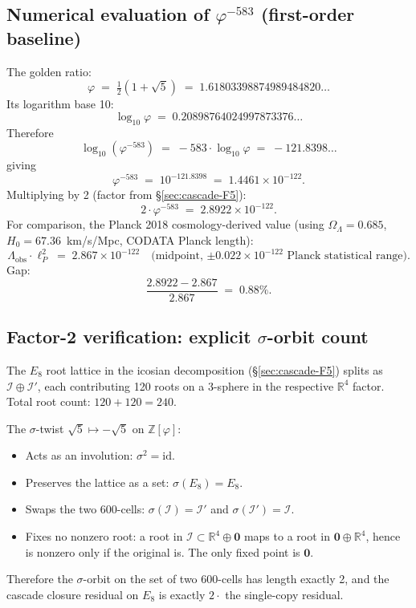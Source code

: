 \documentclass[11pt]{article}
\theoremstyle{plain}
\theoremstyle{definition}
\theoremstyle{remark}
\newcommand{\Zphi}{\mathbb{Z}[\varphi]}
\newcommand{\Ical}{\mathcal{I}}
\begin{document}
\subsection{Numerical evaluation of $\varphi^{-583}$ (first-order baseline)}\label{app:phi-eval}

The golden ratio:
\[
  \varphi \;=\; \tfrac{1}{2}(1 + \sqrt 5) \;=\; 1.61803398874989484820\ldots
\]
Its logarithm base 10:
\[
  \log_{10} \varphi \;=\; 0.20898764024997873376\ldots
\]
Therefore
\[
  \log_{10} (\varphi^{-583}) \;=\; -583 \cdot \log_{10}\varphi \;=\; -121.8398\ldots
\]
giving
\[
  \varphi^{-583} \;=\; 10^{-121.8398} \;=\; 1.4461 \times 10^{-122}.
\]
Multiplying by 2 (factor from \S\ref{sec:cascade-F5}):
\[
  2 \cdot \varphi^{-583} \;=\; 2.8922 \times 10^{-122}.
\]
For comparison, the Planck 2018 cosmology-derived value (using $\Omega_\Lambda = 0.685$, $H_0 = 67.36$~km/s/Mpc, CODATA Planck length):
\[
  \Lambda_\mathrm{obs} \cdot \ell_P^2 \;=\; 2.867 \times 10^{-122} \quad\text{(midpoint, $\pm 0.022 \times 10^{-122}$ Planck statistical range).}
\]
Gap:
\[
  \frac{2.8922 - 2.867}{2.867} \;=\; 0.88\%.
\]

\subsection{Factor-2 verification: explicit $\sigma$-orbit count}\label{app:sigma-orbit}

The $E_8$ root lattice in the icosian decomposition (\S\ref{sec:cascade-F5}) splits as $\Ical \oplus \Ical'$, each contributing 120 roots on a 3-sphere in the respective $\mathbb{R}^4$ factor. Total root count: $120 + 120 = 240$. \checkmark

The $\sigma$-twist $\sqrt 5 \mapsto -\sqrt 5$ on $\Zphi$:
\begin{itemize}[leftmargin=2em]
\item Acts as an involution: $\sigma^2 = \mathrm{id}$. \checkmark
\item Preserves the lattice as a set: $\sigma(E_8) = E_8$. \checkmark
\item Swaps the two 600-cells: $\sigma(\Ical) = \Ical'$ and $\sigma(\Ical') = \Ical$. \checkmark
\item Fixes no nonzero root: a root in $\Ical \subset \mathbb{R}^4 \oplus \mathbf{0}$ maps to a root in $\mathbf{0} \oplus \mathbb{R}^4$, hence is nonzero only if the original is. The only fixed point is $\mathbf{0}$. \checkmark
\end{itemize}
Therefore the $\sigma$-orbit on the set of two 600-cells has length exactly 2, and the cascade closure residual on $E_8$ is exactly $2\cdot$ the single-copy residual. \checkmark
\end{document}
